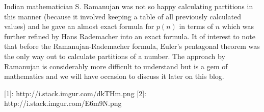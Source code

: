 Indian mathematician S. Ramanujan was not so happy calculating partitions in this manner (because it involved keeping a table of all previously calculated values) and he gave an almost exact formula for $p(n)$ in terms of $n$ which was further refined by Hans Rademacher into an exact formula. It of interest to note that before the Ramanujan-Rademacher formula, Euler's pentagonal theorem was the only way out to calculate partitions of a number. The approach by Ramanujan is considerably more difficult to understand but is a gem of mathematics and we will have occasion to discuss it later on this blog.


  [1]: http://i.stack.imgur.com/dkTHm.png
  [2]: http://i.stack.imgur.com/E6m9N.png
